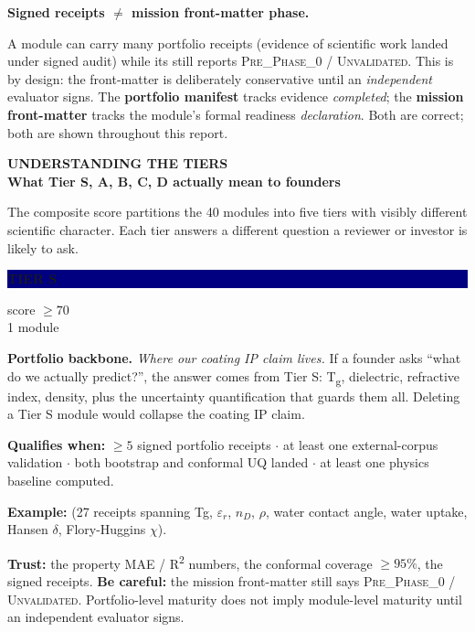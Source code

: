 \documentclass[10pt,a4paper]{article}
\newcommand{\PageTitle}[2]{%
  {\sffamily\fontsize{7.5}{9}\selectfont\bfseries\color{Cyan}\MakeUppercase{#1}}\\[-1pt]
  {\sffamily\fontsize{20}{22}\selectfont\bfseries\color{Navy}#2}\par\vspace{3mm}}
\newcommand{\callout}[2]{%
  \begin{tcolorbox}[enhanced,breakable,colback=Panel,colframe=Line,boxrule=.45pt,arc=2mm,left=3mm,right=3mm,top=2.5mm,bottom=2.5mm]
  {\sffamily\bfseries\color{Navy}#1}\par #2
  \end{tcolorbox}}
\newcommand{\code}[1]{{\ttfamily\fontsize{7.2}{8.4}\selectfont\detokenize{#1}}}
\begin{document}
\vspace{2mm}
\callout{Signed receipts \(\neq\) mission front-matter phase.}{%
A module can carry many portfolio receipts (evidence of scientific work landed under
signed audit) while its \code{mission.md} still reports \textsc{Pre\_Phase\_0} /
\textsc{Unvalidated}. This is by design: the front-matter is deliberately conservative
until an \emph{independent} evaluator signs. The \textbf{portfolio manifest} tracks
evidence \emph{completed}; the \textbf{mission front-matter} tracks the module's
formal readiness \emph{declaration}. Both are correct; both are shown throughout this report.}

\newpage

\PageTitle{Understanding the tiers}{What Tier S, A, B, C, D actually mean to founders}

The composite score partitions the 40 modules into five tiers with visibly different scientific character. Each tier answers a different question a reviewer or investor is likely to ask.

\vspace{-1mm}

\begin{tcolorbox}[enhanced,colback=Panel,colframe=Navy,boxrule=1.2pt,arc=2mm,left=3mm,right=3mm,top=2mm,bottom=2mm]
\begin{minipage}{18mm}
\centering\colorbox{Navy}{\parbox[c][10mm][c]{16mm}{\centering\sffamily\bfseries\color{white}TIER S}}\par
\vspace{1mm}
{\sffamily\fontsize{7.2}{8.4}\selectfont\color{Muted}score \(\geq 70\)\\1 module}
\end{minipage}\hfill
\begin{minipage}{150mm}
\textbf{Portfolio backbone.} \emph{Where our coating IP claim lives.}
If a founder asks \enquote{what do we actually predict?}, the answer comes from Tier S: T\textsubscript{g}, dielectric, refractive index, density, plus the uncertainty quantification that guards them all. Deleting a Tier S module would collapse the coating IP claim.

\vspace{0.5mm}
\textbf{Qualifies when:} \(\geq 5\) signed portfolio receipts \(\cdot\) at least one external-corpus validation \(\cdot\) both bootstrap and conformal UQ landed \(\cdot\) at least one physics baseline computed.

\textbf{Example:} \code{amphora-molecule-property} (27 receipts spanning Tg, \(\varepsilon_r\), \(n_D\), \(\rho\), water contact angle, water uptake, Hansen \(\delta\), Flory-Huggins \(\chi\)).

\textbf{Trust:} the property MAE / R\textsuperscript{2} numbers, the conformal coverage \(\geq 95\%\), the signed receipts.
\textbf{Be careful:} the mission front-matter still says \textsc{Pre\_Phase\_0} / \textsc{Unvalidated}. Portfolio-level maturity does not imply module-level maturity until an independent evaluator signs.
\end{minipage}
\end{tcolorbox}
\end{document}
